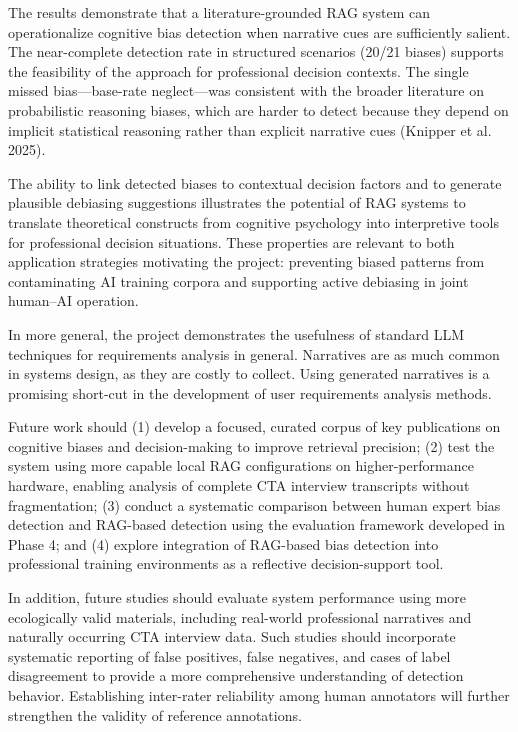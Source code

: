 \documentclass[
  manuscript,
  anonymous,
  review]{acmart}
\begin{document}
The results demonstrate that a literature-grounded RAG system can
operationalize cognitive bias detection when narrative cues are
sufficiently salient. The near-complete detection rate in structured
scenarios (20/21 biases) supports the feasibility of the approach for
professional decision contexts. The single missed bias---base-rate
neglect---was consistent with the broader literature on probabilistic
reasoning biases, which are harder to detect because they depend on
implicit statistical reasoning rather than explicit narrative cues
(Knipper et al. 2025).

The ability to link detected biases to contextual decision factors and
to generate plausible debiasing suggestions illustrates the potential of
RAG systems to translate theoretical constructs from cognitive
psychology into interpretive tools for professional decision situations.
These properties are relevant to both application strategies motivating
the project: preventing biased patterns from contaminating AI training
corpora and supporting active debiasing in joint human--AI operation.

In more general, the project demonstrates the usefulness of standard LLM
techniques for requirements analysis in general. Narratives are as much
common in systems design, as they are costly to collect. Using generated
narratives is a promising short-cut in the development of user
requirements analysis methods.

Future work should (1) develop a focused, curated corpus of key
publications on cognitive biases and decision-making to improve
retrieval precision; (2) test the system using more capable local RAG
configurations on higher-performance hardware, enabling analysis of
complete CTA interview transcripts without fragmentation; (3) conduct a
systematic comparison between human expert bias detection and RAG-based
detection using the evaluation framework developed in Phase 4; and (4)
explore integration of RAG-based bias detection into professional
training environments as a reflective decision-support tool.

In addition, future studies should evaluate system performance using
more ecologically valid materials, including real-world professional
narratives and naturally occurring CTA interview data. Such studies
should incorporate systematic reporting of false positives, false
negatives, and cases of label disagreement to provide a more
comprehensive understanding of detection behavior. Establishing
inter-rater reliability among human annotators will further strengthen
the validity of reference annotations.
\end{document}
